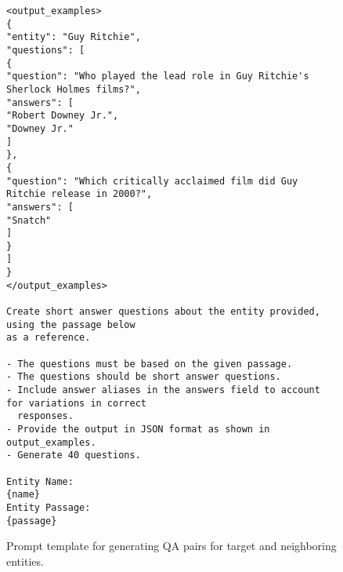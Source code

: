 \onecolumn

\begin{figure}[ht]
\begin{tcolorbox}[width=0.9\textwidth, colback=white, colframe=black, boxsep=5pt, fontupper=\small]
\begin{verbatim}
<output_examples>
{
"entity": "Guy Ritchie",
"questions": [
{
"question": "Who played the lead role in Guy Ritchie's Sherlock Holmes films?",
"answers": [
"Robert Downey Jr.",
"Downey Jr."
]
},
{
"question": "Which critically acclaimed film did Guy Ritchie release in 2000?",
"answers": [
"Snatch"
]
}
]
}
</output_examples>

Create short answer questions about the entity provided, using the passage below
as a reference.

- The questions must be based on the given passage.
- The questions should be short answer questions.
- Include answer aliases in the answers field to account for variations in correct 
  responses.
- Provide the output in JSON format as shown in output_examples.
- Generate 40 questions.

Entity Name: 
{name}
Entity Passage:
{passage}
\end{verbatim}
\end{tcolorbox}
\caption{Prompt template for generating QA pairs for target and neighboring entities.}
\end{figure}
\twocolumn